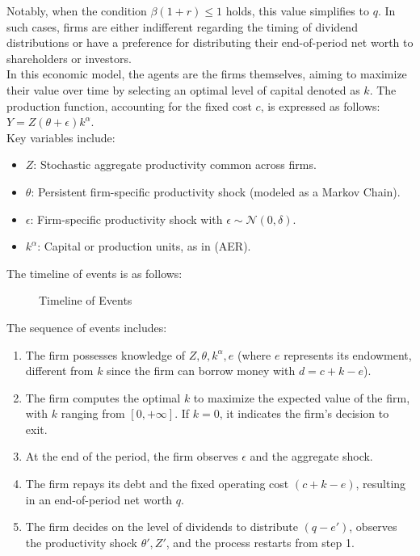 \documentclass[12pt]{report}
\begin{document}
Notably, when the condition $\beta(1+r) \leq 1$ holds, this value simplifies to $q$. In such cases, firms are either
indifferent regarding the timing of dividend distributions or have a preference for distributing their end-of-period net
worth to shareholders or investors.
\\
In this economic model, the agents are the firms themselves, aiming to maximize their value over time by selecting an
optimal level of capital denoted as $k$. The production function, accounting for the fixed cost $c$, is expressed as
follows: $Y = Z(\theta + \epsilon)k^\alpha$.
\\
Key variables include:
\begin{itemize}
    \item $Z$: Stochastic aggregate productivity common across firms.
    \item $\theta$: Persistent firm-specific productivity shock (modeled as a Markov Chain).
    \item $\epsilon$: Firm-specific productivity shock with $\epsilon \sim \mathcal{N}(0,\delta)$.
    \item $k^\alpha$: Capital or production units, as in \cite{CabHarm94} (AER).
\end{itemize}

The timeline of events is as follows:

\begin{figure}[H]
    \centering
    \caption{Timeline of Events}
\end{figure}

The sequence of events includes:
\begin{enumerate}
    \item The firm possesses knowledge of $Z,\theta,k^\alpha,e$ (where $e$ represents its endowment, different from $k$ since the firm can borrow money with $d=c+k-e$).
    \item The firm computes the optimal $k$ to maximize the expected value of the firm, with $k$ ranging from $[0,+\infty]$. If $k=0$, it indicates the firm's decision to exit.
    \item At the end of the period, the firm observes $\epsilon$ and the aggregate shock.
    \item The firm repays its debt and the fixed operating cost $(c+k-e)$, resulting in an end-of-period net worth $q$.
    \item The firm decides on the level of dividends to distribute $(q-e')$, observes the productivity shock $\theta', Z'$, and the process restarts from step 1.
\end{enumerate}
\end{document}
